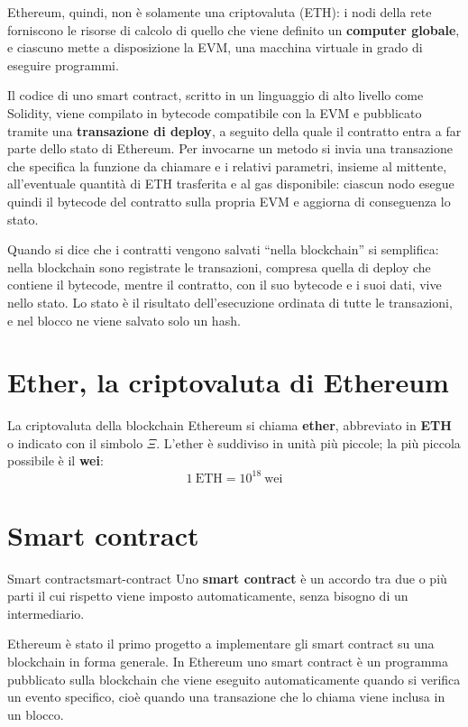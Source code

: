 \documentclass[a4paper, 11pt, oneside]{book}
\begin{document}
	Ethereum, quindi, non è solamente una criptovaluta (ETH): i nodi della rete
	forniscono le risorse di calcolo di quello che viene definito un \textbf{computer
	globale}, e ciascuno mette a disposizione la EVM, una macchina virtuale in grado di
	eseguire programmi.

	Il codice di uno smart contract, scritto in un linguaggio di alto livello come
	Solidity, viene compilato in bytecode compatibile con la EVM e pubblicato tramite una
	\textbf{transazione di deploy}, a seguito della quale il contratto entra a far parte
	dello stato di Ethereum. Per invocarne un metodo si invia una transazione che
	specifica la funzione da chiamare e i relativi parametri, insieme al mittente,
	all'eventuale quantità di ETH trasferita e al gas disponibile: ciascun nodo esegue
	quindi il bytecode del contratto sulla propria EVM e aggiorna di conseguenza lo stato.

	\begin{nota}
		Quando si dice che i contratti vengono salvati ``nella blockchain'' si semplifica:
		nella blockchain sono registrate le transazioni, compresa quella di deploy che
		contiene il bytecode, mentre il contratto, con il suo bytecode e i suoi dati, vive
		nello stato. Lo stato è il risultato dell'esecuzione ordinata di tutte le
		transazioni, e nel blocco ne viene salvato solo un hash.
	\end{nota}

	\section{Ether, la criptovaluta di Ethereum}
	La criptovaluta della blockchain Ethereum si chiama \textbf{ether}, abbreviato in
	\textbf{ETH} o indicato con il simbolo $\Xi$. L'ether è suddiviso in unità più
	piccole; la più piccola possibile è il \textbf{wei}:
	\[
		1\ \text{ETH} = 10^{18}\ \text{wei}
	\]

	\section{Smart contract}
	\begin{definizione}{Smart contract}{smart-contract}
		Uno \textbf{smart contract} è un accordo tra due o più parti il cui rispetto
		viene imposto automaticamente, senza bisogno di un intermediario.
	\end{definizione}

	Ethereum è stato il primo progetto a implementare gli smart contract su una
	blockchain in forma generale. In Ethereum uno smart contract è un programma
	pubblicato sulla blockchain che viene eseguito automaticamente quando si verifica un
	evento specifico, cioè quando una transazione che lo chiama viene inclusa in un
	blocco.
\end{document}
